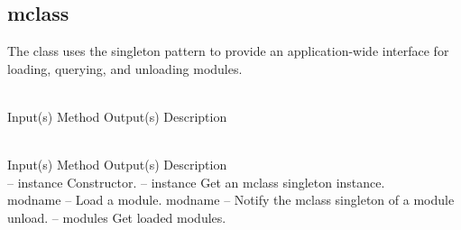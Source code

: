 %
%
%
%
%

\subsection{mclass}
\label{sec:mclass}

The  class uses the singleton pattern to provide an
application-wide interface for loading, querying, and unloading modules.

\begin{longtable}{}
\caption{mclass summary}
\\
\hline
\optableent
	{Input(s)}
	{Method}
	{Output(s)}
	{Description}
\hline \hline
\endfirsthead
\caption[]{\emph{continued}} \\
\hline
\optableent
	{Input(s)}
	{Method}
	{Output(s)}
	{Description}
\hline \hline \endhead
{} \endfoot
\hline \endlastfoot
 \\
\hline \hline
\optableent
	{--}
	{{\bf {}}}
	{instance}
	{Constructor.}
\hline
\optableent
	{--}
	{{\bf {}}}
	{instance}
	{Get an mclass singleton instance.}
\hline \hline
{} \\
\hline \hline
\optableent
	{modname}
	{{\bf {}}}
	{--}
	{Load a module.}
\hline
\optableent
	{modname}
	{{\bf {}}}
	{--}
	{Notify the mclass singleton of a module unload.}
\hline
\optableent
	{--}
	{{\bf {}}}
	{modules}
	{Get loaded modules.}
\end{longtable}

